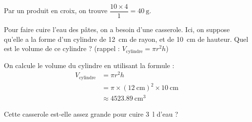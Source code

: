 \documentclass[../Cours.tex]{subfiles}
\begin{document}
\begin{questions}
{\begin{center}
        Par un produit en croix, on trouve $\dfrac{10 \times 4}{1} = \qty{40}{\gram}$.
    \end{center}
    }
    
    \question Pour faire cuire l'eau des pâtes, on a besoin d'une casserole. Ici, on suppose qu'elle a la forme d'un cylindre de \qty{12}{\centi\metre} de rayon, et de \qty{10}{\centi\metre} de hauteur.
        \subquestion Quel est le volume de ce cylindre ? (rappel : $V_{\mbox{cylindre}} = \pi r^2 h$)

        {\color{rouge}
            On calcule le volume du cylindre en utilisant la formule :
            \begin{align*}
                V_{\mbox{cylindre}} &= \pi r^2 h \\
                &= \pi \times (\qty{12}{\centi\metre})^2 \times \qty{10}{\centi\metre} \\
                &\approx \boxed{\qty{4523.89}{\centi\metre\cubed}}
            \end{align*}
        }
        
        \subquestion Cette casserole est-elle assez grande pour cuire \qty{3}{\litre} d'eau ?


\end{questions}
\end{document}
